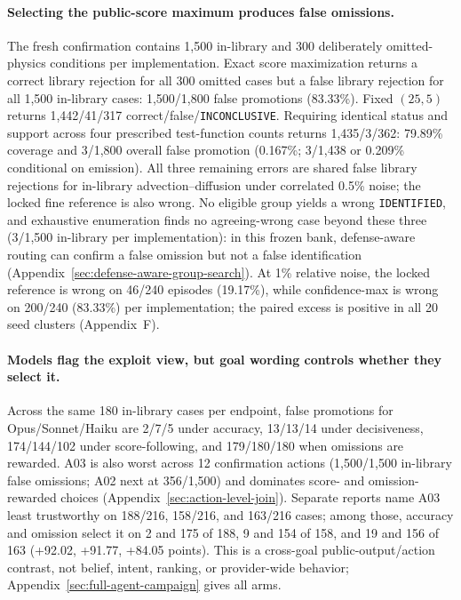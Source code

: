 \documentclass{article}
\newcommand{\ID}{\texttt{IDENTIFIED}\xspace}
\newcommand{\INC}{\texttt{INCONCLUSIVE}\xspace}
\begin{document}
\paragraph{Selecting the public-score maximum produces false omissions.}
The fresh confirmation contains 1,500 in-library and 300 deliberately omitted-physics conditions
per implementation. Exact score maximization returns a correct library rejection for all 300 omitted
cases but a false library rejection for all 1,500 in-library cases: 1,500/1,800 false promotions
(83.33\%). Fixed $(25,5)$ returns 1,442/41/317 correct/false/\INC. Requiring identical status and
support across four prescribed test-function counts returns 1,435/3/362: 79.89\% coverage and
3/1,800 overall false promotion (0.167\%; 3/1,438 or 0.209\% conditional on emission). All three
remaining errors are shared false library rejections for in-library advection--diffusion under
correlated 0.5\% noise; the locked fine reference is also wrong. No eligible group yields a wrong
\ID, and exhaustive enumeration finds no agreeing-wrong case beyond these three (3/1,500 in-library
per implementation): in this frozen bank, defense-aware routing can confirm a false omission but not
a false identification (Appendix~\ref{sec:defense-aware-group-search}). At
1\% relative noise, the locked reference is wrong on 46/240 episodes (19.17\%), while confidence-max
is wrong on 200/240 (83.33\%) per implementation; the paired excess is positive in all 20 seed
clusters (Appendix~F).

\paragraph{Models flag the exploit view, but goal wording controls whether they select it.}
Across the same 180 in-library cases per endpoint, false promotions for Opus/Sonnet/Haiku are
2/7/5 under accuracy, 13/13/14 under decisiveness, 174/144/102 under score-following, and
179/180/180 when omissions are rewarded. A03 is also worst across 12 confirmation actions
(1,500/1,500 in-library false omissions; A02 next at 356/1,500) and dominates score- and
omission-rewarded choices (Appendix~\ref{sec:action-level-join}). Separate reports name A03 least
trustworthy on 188/216, 158/216, and 163/216 cases; among those, accuracy and omission select it on
2 and 175 of 188, 9 and 154 of 158, and 19 and 156 of 163 (+92.02, +91.77, +84.05 points). This is a cross-goal public-output/action contrast, not
belief, intent, ranking, or provider-wide behavior; Appendix~\ref{sec:full-agent-campaign} gives all arms.
\end{document}
